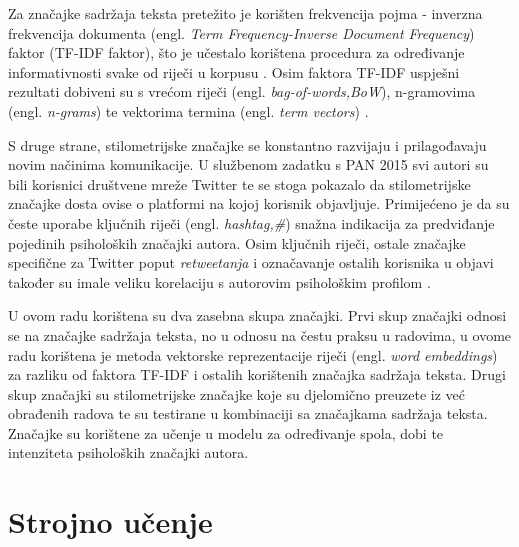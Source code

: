 \documentclass[times, utf8, zavrsni]{fer}
\begin{document}
Za značajke sadržaja teksta pretežito je korišten frekvencija pojma - inverzna frekvencija dokumenta (engl. \textit{Term Frequency-Inverse Document Frequency}) faktor (TF-IDF faktor), što je učestalo korištena procedura za određivanje informativnosti svake od riječi u korpusu \citep{notebook2015}. Osim faktora TF-IDF uspješni rezultati dobiveni su s vrećom riječi (engl. \textit{bag-of-words,BoW}), n-gramovima (engl. \textit{n-grams}) te vektorima termina (engl. \textit{term vectors}) \citep{rangle2015}. 

S druge strane, stilometrijske značajke se konstantno razvijaju i prilagođavaju novim načinima komunikacije. U službenom zadatku s PAN 2015 svi autori su bili korisnici društvene mreže Twitter te se stoga pokazalo da stilometrijske značajke dosta ovise o platformi na kojoj korisnik objavljuje. Primijećeno je da su česte uporabe ključnih riječi (engl. \textit{hashtag,\#}) snažna indikacija za predviđanje pojedinih psiholoških značajki autora. Osim ključnih riječi, ostale značajke specifične za Twitter poput \textit{retweetanja} i označavanje ostalih korisnika u objavi također su imale veliku korelaciju s autorovim psihološkim profilom \citep{rangle2015}.

U ovom radu korištena su dva zasebna skupa značajki. Prvi skup značajki odnosi se na značajke sadržaja teksta, no u odnosu na čestu praksu u radovima, u ovome radu korištena je metoda vektorske reprezentacije riječi (engl. \textit{word embeddings}) za razliku od faktora TF-IDF i ostalih korištenih značajka sadržaja teksta. Drugi skup značajki su stilometrijske značajke koje su djelomično preuzete iz već obrađenih radova te su testirane u kombinaciji sa značajkama sadržaja teksta. Značajke su korištene za učenje u modelu za određivanje spola, dobi te intenziteta psiholoških značajki autora. 


 
\chapter{Strojno učenje}
\end{document}
